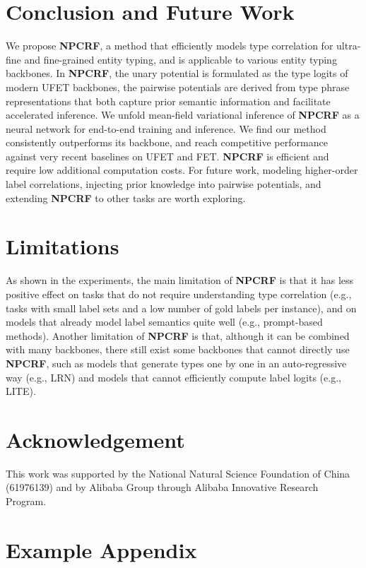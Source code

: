 \documentclass[11pt]{article}
\begin{document}
 \section{Conclusion and Future Work}
We propose {\bf \textsc{NPCRF}}, a method that efficiently models type correlation for ultra-fine and fine-grained entity typing, and is applicable to various entity typing backbones. In {\bf \textsc{NPCRF}}, the unary potential is formulated as the type logits of modern UFET backbones, the pairwise potentials are derived from type phrase representations that both capture prior semantic information and facilitate accelerated inference. We unfold mean-field variational inference of {\bf \textsc{NPCRF}} as a neural network for end-to-end training and inference. We find our method consistently outperforms its backbone, and reach competitive performance against very recent baselines on UFET and FET.  {\bf \textsc{NPCRF}} is efficient and require low additional computation costs. For future work, modeling higher-order label correlations, injecting prior knowledge into pairwise potentials, and extending {\bf \textsc{NPCRF}} to other tasks are worth exploring. \section*{Limitations}
As shown in the experiments, the main limitation of {\bf \textsc{NPCRF}} is that it has less positive effect on tasks that do not require understanding type correlation (e.g., tasks with small label sets and a low number of gold labels per instance), and on models that already model label semantics quite well (e.g., prompt-based methods). Another limitation of {\bf \textsc{NPCRF}} is that, although it can be combined with many backbones, there still exist some backbones that cannot directly use {\bf \textsc{NPCRF}}, such as models that generate types one by one in an auto-regressive way (e.g., LRN) and models that cannot efficiently compute label logits (e.g., LITE). \section{Acknowledgement}
This work was supported by the National Natural Science Foundation of China (61976139) and by Alibaba Group through Alibaba Innovative Research Program. 



\appendix


\section{Example Appendix}
\label{sec:appendix}
 
\end{document}
